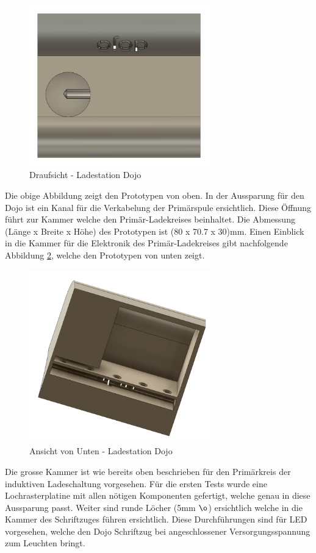 \begin{figure}[H]
	\begin{center}
		\includegraphics[width=80mm]{data/DojoLadestation02.png}
		\caption[Prototyp Ladestation Draufsicht]{Draufsicht - Ladestation Dojo} %
		\label{fig:Prototyp Top}
	\end{center}
\end{figure}

Die obige Abbildung  zeigt den Prototypen von oben. In der Aussparung für den Dojo ist ein Kanal für die Verkabelung der Primärspule ersichtlich. Diese Öffnung führt zur Kammer welche den Primär-Ladekreises beinhaltet. Die Abmessung (Länge x Breite x Höhe) des Prototypen ist (80 x 70.7 x 30)mm. Einen Einblick in die Kammer für die Elektronik des Primär-Ladekreises gibt nachfolgende Abbildung \ref{fig:Prototyp Down}, welche den Prototypen von unten zeigt.

\begin{figure}[H]
	\begin{center}
		\includegraphics[width=80mm]{data/DojoLadestation03.png}
		\caption[Prototyp Ladestation Ansicht von Unten]{Ansicht von Unten - Ladestation Dojo} %
		\label{fig:Prototyp Down}
	\end{center}
\end{figure}

Die grosse Kammer ist wie bereits oben beschrieben für den Primärkreis der induktiven Ladeschaltung vorgesehen. Für die ersten Tests wurde eine Lochrasterplatine mit allen nötigen Komponenten gefertigt, welche genau in diese Aussparung passt. Weiter sind runde Löcher (5mm $\o$) ersichtlich welche in die Kammer des Schriftzuges führen ersichtlich. Diese Durchführungen sind für LED vorgesehen, welche den Dojo Schriftzug bei angeschlossener Versorgungsspannung zum Leuchten bringt. 